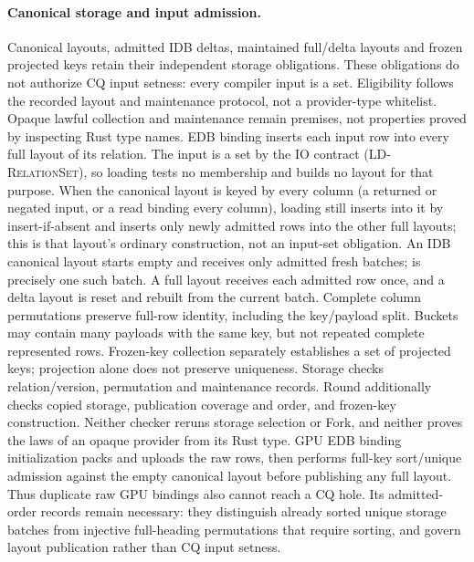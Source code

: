 \paragraph{Canonical storage and input admission.}
Canonical layouts, admitted IDB deltas, maintained full/delta layouts and
frozen projected keys retain their independent storage obligations. These
obligations do not authorize CQ input setness: every compiler input is a set.
Eligibility follows the recorded layout and maintenance protocol, not a
provider-type whitelist. Opaque lawful collection and maintenance remain
premises, not properties proved by inspecting Rust type names.
EDB binding inserts each input row into every full layout of its relation.
The input is a set by the IO contract (\textsc{LD-RelationSet}), so loading
tests no membership and builds no layout for that purpose. When the
canonical layout is keyed by every column (a returned or negated input, or a
read binding every column), loading still inserts into it by insert-if-absent
and inserts only newly admitted rows into the other full layouts; this is
that layout's ordinary construction, not an input-set obligation.
An IDB canonical layout starts empty and receives only admitted fresh batches;
 is precisely one such batch. A full layout receives each admitted
row once, and a delta layout is reset and rebuilt from the current batch.
Complete column permutations preserve full-row identity, including the
key/payload split. Buckets may contain many payloads with the same key, but not
repeated complete represented rows. Frozen-key collection separately
establishes a set of projected keys; projection alone does not preserve uniqueness.
Storage checks relation/version, permutation and maintenance records. Round
additionally checks copied storage, publication coverage and order, and
frozen-key construction. Neither checker reruns storage selection or Fork,
and neither proves the laws of an opaque provider from its Rust type.
GPU EDB binding initialization packs and uploads the raw rows, then performs
full-key sort/unique admission against the empty canonical layout before
publishing any full layout. Thus duplicate raw GPU bindings also cannot reach
a CQ hole. Its admitted-order records remain necessary: they distinguish
already sorted unique storage batches from injective full-heading permutations
that require sorting, and govern layout publication rather than CQ input setness.

